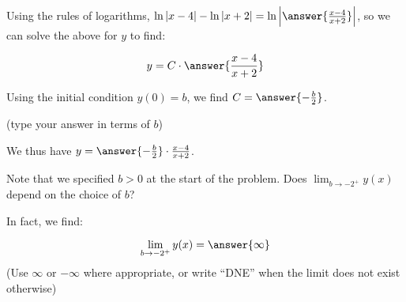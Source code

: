 \documentclass{ximera}
\begin{document}
\begin{exercise}
\begin{hint}
\begin{question}
\begin{question}
Using the rules of logarithms, $ \ln|x-4| - \ln|x+2| =  \ln\left| \answer{\frac{x-4}{x+2}} \right|$, so we can solve the above for $y$ to find:

\[
y= C \cdot \answer{\frac{x-4}{x+2}} \\
\]
  
\begin{question}  
Using the initial condition $y(0)=b$, we find $C=\answer{-\frac{b}{2}}$.

(type your answer in terms of $b$)

We thus have $y = \answer{-\frac{b}{2}} \cdot \frac{x-4}{x+2}$.


\end{question}
\end{question}
\end{question}
 \end{hint}
 
\begin{exercise}
Note that we specified $b>0$ at the start of the problem.  Does $\lim_{b \to -2^+} y(x)$ depend on the choice of $b$?
\begin{multipleChoice}
\end{multipleChoice}
In fact, we find:

\[
\lim_{b \to -2^+} y(x) = \answer{\infty}
\]
(Use $\infty$ or $-\infty$ where appropriate, or write ``DNE'' when the limit does not exist otherwise)
\end{exercise}
 
\end{exercise}
\end{document}
